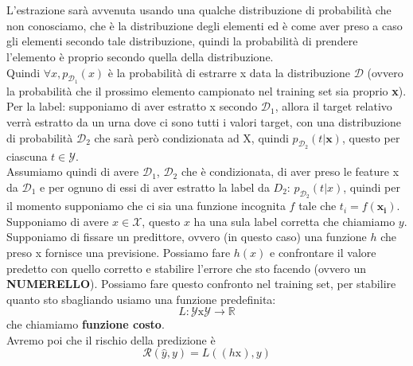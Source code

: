 \documentclass[12pt, oneside]{extbook}
\begin{document}
\\\\L'estrazione sarà avvenuta usando una qualche distribuzione di probabilità che non conosciamo, che è la distribuzione degli elementi ed è come aver preso a caso gli elementi secondo tale distribuzione, quindi la probabilità di prendere l'elemento è proprio secondo quella della distribuzione.\\Quindi $\forall x, p_{\mathscr{D}_1}(x)$ è la probabilità di estrarre x data la distribuzione $\mathscr{D}$ (ovvero la probabilità che il prossimo elemento campionato nel training set sia proprio \textbf{x}).\\Per la label: supponiamo di aver estratto x secondo $\mathscr{D}_1$, allora il target relativo verrà estratto da un urna dove ci sono tutti i valori target, con una distribuzione di probabilità $\mathscr{D}_2$ che sarà però condizionata ad X, quindi $p_{\mathscr{D}_2}(t|\boldsymbol{x})$, questo per ciascuna $t \in \mathscr{Y}$.\\Assumiamo quindi di avere $\mathscr{D}_1$, $\mathscr{D}_2$ che è condizionata, di aver preso le feature x da $\mathscr{D}_1$ e per ognuno di essi di aver estratto la label da $D_2$: $p_{\mathscr{D}_2}(t|x)$, quindi per il momento supponiamo che ci sia una funzione incognita $f$ tale che $t_i = f(\boldsymbol{x_i})$.\\Supponiamo di avere $x \in \mathscr{X}$, questo $x$ ha una sula label corretta che chiamiamo $y$.\\Supponiamo di fissare un predittore, ovvero (in questo caso) una funzione $h$ che preso x fornisce una previsione. Possiamo fare $h(x)$ e confrontare il valore predetto con quello corretto e stabilire l'errore che sto facendo (ovvero un \textbf{NUMERELLO}). Possiamo fare questo confronto nel training set, per stabilire quanto sto sbagliando usiamo una funzione predefinita: 
\begin{equation}
	L: \mathscr{Y} \text{x} \mathscr{Y} \rightarrow \mathbb{R}
\end{equation}
che chiamiamo \textbf{funzione costo}.\\Avremo poi che il rischio della predizione è 
\begin{equation}
	\mathscr{R}(\hat{y}, y) = L((h\text{x}), y)
\end{equation}\\
\end{document}
